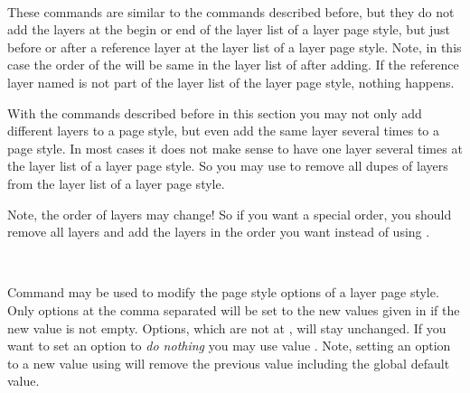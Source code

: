 \begin{Declaration}
  \\
\end{Declaration}
%
%
These commands are similar to the commands described before, but they do not
add the layers at the begin or end of the layer list of a layer page style,
but just before or after a reference layer at the layer list of a layer page
style. Note, in this case the order of the  will be
same in the layer list of  after adding. If the
reference layer named  is not part of the layer
list of the layer page style, nothing happens.%
%

\begin{Declaration}
\end{Declaration}
%
With the commands described before in this section you may not only add
different layers to a page style, but even add the same layer several times to
a page style. In most cases it does not make sense to have one layer several
times at the layer list of a layer page style. So you may use
 to remove all dupes of layers from the layer
list of a layer page style. 

Note, the order of layers may change! So if
you want a special order, you should remove all layers and add the layers in
the order you want instead of using .%

\begin{Declaration}
  \\
\end{Declaration}
%
%
Command  may be used to modify the page
style options of a layer page style. Only options at the comma separated
 will be set to the new values given in 
if the new value is not empty. Options, which are not at ,
will stay unchanged. If you want to set an option to \emph{do nothing} you may
use value . Note, setting an option to a new value using
 will remove the previous value including
the global default value.

